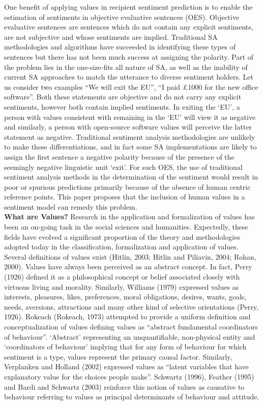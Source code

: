 One benefit of applying values in recipient sentiment prediction is to enable the estimation of sentiments in objective evaluative sentences (OES). Objective evaluative sentences are sentences which do not contain any explicit sentiments, are not subjective and whose sentiments are implied. Traditional SA methodologies and algorithms have succeeded in identifying these types of sentences but there has not been much success at assigning the polarity. Part of the problem lies in the one-size-fits all nature of SA, as well as the inability of current SA approaches to match the utterance to diverse sentiment holders. Let us consider two examples ``We will exit the EU'', ``I paid \pounds 1000 for the new office software''. Both these statements are objective and do not carry any explicit sentiments, however both contain implied sentiments. In exiting the `EU', a person with values consistent with remaining in the `EU' will view it as negative and similarly, a person with open-source software values will perceive the latter statement as negative. Traditional sentiment analysis methodologies are unlikely to make these differentiations, and in fact some SA implementations are likely to assign the first sentence a negative polarity because of the presence of the seemingly negative linguistic unit `exit'. For such OES, the use of traditional sentiment analysis methods in the determination of the sentiment would result in poor or spurious predictions primarily because of the absence of human centric reference points. This paper proposes that the inclusion of human values in a sentiment model can remedy this problem. \\
\noindent \textbf{What are Values?}
\newline Research in the application and formalization of values has been an on-going task in the social sciences and humanities. Expectedly, these fields have evolved a significant proportion of the theory and methodologies adopted today in the classification, formalization and application of values. Several definitions of values exist (Hitlin, 2003; Hitlin and Piliavin, 2004; Rohan, 2000). Values have always been perceived as an abstract concept. In fact, Perry (1926) defined it as a philosophical concept or belief associated closely with virtuous living and morality. Similarly, Williams (1979) expressed values as interests, pleasures, likes, preferences, moral obligations, desires, wants, goals, needs, aversions, attractions and many other kind of selective orientations (Perry, 1926). Rokeach (Rokeach, 1973) attempted to provide a uniform definition and conceptualization of values defining values as ``abstract fundamental coordinators of behaviour''. `Abstract' representing an unquantifiable, non-physical entity and `coordinators of behaviour' implying that for any form of behaviour for which sentiment is a type, values represent the primary causal factor. Similarly, Verplanken and Holland (2002) expressed values as ``latent variables that have explanatory value for the choices people make''. Schwartz (1996), Feather (1995) and Bardi and Schwartz (2003) reinforce this notion of values as causative to behaviour referring to values as principal determinants of behaviour and attitude. 


